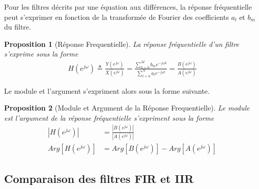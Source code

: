 \documentclass[11pt,a4paper]{IEEEtran}
\newtheorem{proposition}{Proposition}
\begin{document}
Pour les filtres décrits par une équation aux différences, la réponse fréquentielle peut s'exprimer en fonction de la transformée de Fourier des coefficients $a_l$ et $b_m$ du filtre.
\begin{proposition}[Réponse Frequentielle]
La réponse fréquentielle d'un filtre s'exprime sous la forme
\begin{align*}
H(e^{j\omega})\triangleq \frac{Y(e^{j\omega})}{X(e^{j\omega})}=\frac{\sum_{k=0}^{M}b_m e^{-j\omega k}}{\sum_{l=0}^{N}a_l e^{-j\omega l}}=\frac{B(e^{j\omega})}{A(e^{j\omega})}
\end{align*}
\end{proposition}
Le module et l'argument s'expriment alors sous la forme suivante.
\begin{proposition}[Module et Argument de la Réponse Frequentielle]
Le module est l'argument de la réponse fréquentielle s'expriment sous la forme
\begin{align*}
|H(e^{j\omega})|&=\frac{|B(e^{j\omega})|}{|A(e^{j\omega})|}\\
Arg[H(e^{j\omega})]&=Arg[B(e^{j\omega})]-Arg[A(e^{j\omega})]
\end{align*}
\end{proposition}

\subsection{Comparaison des filtres FIR et IIR}
\end{document}

